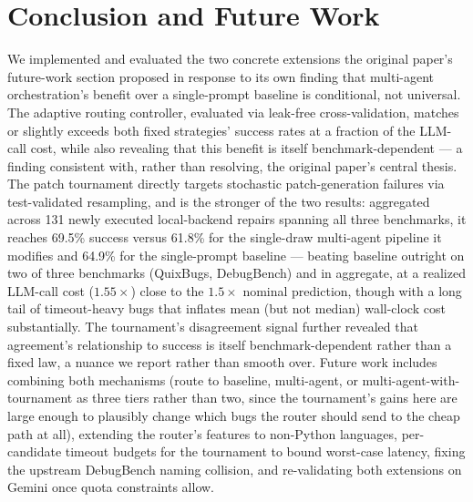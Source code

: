 \documentclass[conference]{IEEEtran}
\begin{document}
\section{Conclusion and Future Work}
We implemented and evaluated the two concrete extensions the original paper's future-work section proposed in response to its own finding that multi-agent orchestration's benefit over a single-prompt baseline is conditional, not universal. The adaptive routing controller, evaluated via leak-free cross-validation, matches or slightly exceeds both fixed strategies' success rates at a fraction of the LLM-call cost, while also revealing that this benefit is itself benchmark-dependent — a finding consistent with, rather than resolving, the original paper's central thesis. The patch tournament directly targets stochastic patch-generation failures via test-validated resampling, and is the stronger of the two results: aggregated across 131 newly executed local-backend repairs spanning all three benchmarks, it reaches 69.5\% success versus 61.8\% for the single-draw multi-agent pipeline it modifies and 64.9\% for the single-prompt baseline — beating baseline outright on two of three benchmarks (QuixBugs, DebugBench) and in aggregate, at a realized LLM-call cost ($1.55\times$) close to the $1.5\times$ nominal prediction, though with a long tail of timeout-heavy bugs that inflates mean (but not median) wall-clock cost substantially. The tournament's disagreement signal further revealed that agreement's relationship to success is itself benchmark-dependent rather than a fixed law, a nuance we report rather than smooth over. Future work includes combining both mechanisms (route to baseline, multi-agent, or multi-agent-with-tournament as three tiers rather than two, since the tournament's gains here are large enough to plausibly change which bugs the router should send to the cheap path at all), extending the router's features to non-Python languages, per-candidate timeout budgets for the tournament to bound worst-case latency, fixing the upstream DebugBench naming collision, and re-validating both extensions on Gemini once quota constraints allow.



\end{document}
